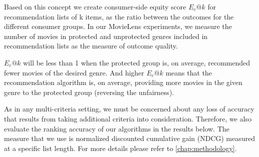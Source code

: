 Based on this concept we create consumer-side equity score $E_c@k$ for recommendation lists of k items, as the ratio between the outcomes for the different consumer groups. In our MovieLens experiments, we measure the number of movies in protected and unprotected genres included in recommendation lists as the measure of outcome quality. 




$E_c@k$ will be less than 1 when the protected group is, on average, recommended fewer movies of the desired genre. And higher $E_c@k$ means that the recommendation algorithm is, on average, providing more movies in the given genre to the protected group (reversing the unfairness).



As in any multi-criteria setting, we must be concerned about any loss of accuracy that results from taking additional criteria into consideration. Therefore, we also evaluate the ranking accuracy of our algorithms in the results below. The measure that we use is normalized discounted cumulative gain (NDCG) measured at a specific list length. For more details please refer to \ref{chap:methodology}.

